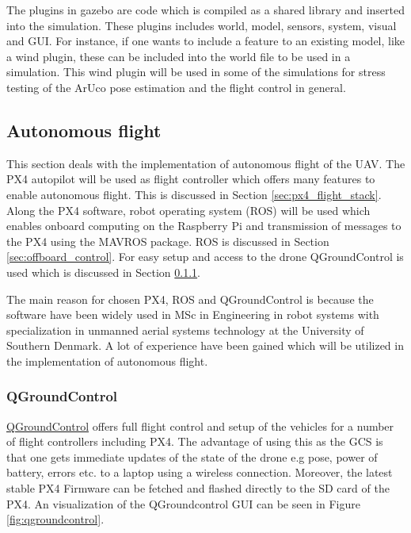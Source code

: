 \documentclass[../Head/report.tex]{subfiles}
\begin{document}
The plugins in gazebo are code which is compiled as a shared library and inserted into the simulation. These plugins includes world, model, sensors, system, visual and GUI. For instance, if one wants to include a feature to an existing model, like a wind plugin, these can be included into the world file to be used in a simulation. This wind plugin will be used in some of the simulations for stress testing of the ArUco pose estimation and the flight control in general.

\subsection{Autonomous flight}

This section deals with the implementation of autonomous flight of the UAV. The PX4 autopilot will be used as flight controller which offers many features to enable autonomous flight. This is discussed in Section \ref{sec:px4_flight_stack}. Along the PX4 software, robot operating system (ROS) will be used which enables onboard computing on the Raspberry Pi and transmission of messages to the PX4 using the MAVROS package. ROS is discussed in Section \ref{sec:offboard_control}. For easy setup and access to the drone QGroundControl is used which is discussed in Section \ref{sec:qgroundcontrol}. 

The main reason for chosen PX4, ROS and QGroundControl is because the software have been widely used in MSc in Engineering in robot systems with
specialization in unmanned aerial systems technology at the University of Southern Denmark. A lot of experience have been gained which will be utilized in the implementation of autonomous flight.

\subsubsection{QGroundControl}
\label{sec:qgroundcontrol}

\href{https://docs.qgroundcontrol.com/master/en/}{QGroundControl} offers full flight control and setup of the vehicles for a number of flight controllers including PX4. The advantage of using this as the GCS is that one gets immediate updates of the state of the drone e.g pose, power of battery, errors etc. to a laptop using a wireless connection.  Moreover, the latest stable PX4 Firmware can be fetched and flashed directly to the SD card of the PX4. An visualization of the QGroundcontrol GUI can be seen in Figure \ref{fig:qgroundcontrol}.
\end{document}
